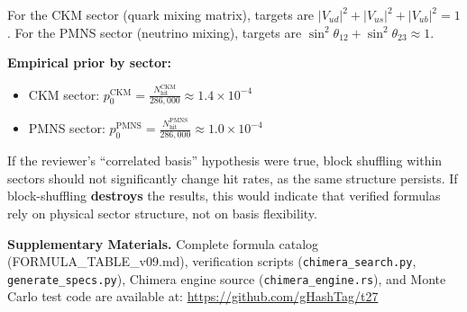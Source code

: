 \documentclass[10pt,a4paper]{article}
\begin{document}
For the CKM sector (quark mixing matrix), targets are
$|V_{ud}|^2 + |V_{us}|^2 + |V_{ub}|^2 = 1$. For the PMNS sector
(neutrino mixing), targets are $\sin^2\theta_{12} + \sin^2\theta_{23} \approx 1$.

\textbf{Empirical prior by sector:}
\begin{itemize}
  \item CKM sector: $p_0^{\text{CKM}} = \frac{N_{\text{hit}}^{\text{CKM}}}{286,000} \approx 1.4 \times 10^{-4}$
  \item PMNS sector: $p_0^{\text{PMNS}} = \frac{N_{\text{hit}}^{\text{PMNS}}}{286,000} \approx 1.0 \times 10^{-4}$
\end{itemize}

If the reviewer's ``correlated basis'' hypothesis were true, block shuffling within sectors
should not significantly change hit rates, as the same structure persists.
If block-shuffling \textbf{destroys} the results, this would indicate that
verified formulas rely on physical sector structure, not on basis flexibility.

\medskip
\noindent\textbf{Supplementary Materials.}
Complete formula catalog (FORMULA\_TABLE\_v09.md), verification scripts
(\texttt{chimera\_search.py}, \texttt{generate\_specs.py}), Chimera engine source
(\texttt{chimera\_engine.rs}), and Monte Carlo test code are available at:
\url{https://github.com/gHashTag/t27}
\end{document}
